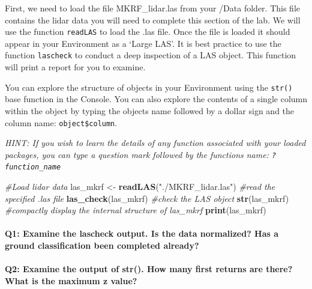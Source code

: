 \documentclass[
]{book}
\newenvironment{Shaded}{\begin{snugshade}}{\end{snugshade}}
\newcommand{\CommentTok}[1]{\textcolor[rgb]{0.56,0.35,0.01}{\textit{#1}}}
\newcommand{\FunctionTok}[1]{\textcolor[rgb]{0.13,0.29,0.53}{\textbf{#1}}}
\newcommand{\NormalTok}[1]{#1}
\newcommand{\OtherTok}[1]{\textcolor[rgb]{0.56,0.35,0.01}{#1}}
\newcommand{\StringTok}[1]{\textcolor[rgb]{0.31,0.60,0.02}{#1}}
\begin{document}
First, we need to load the file MKRF\_lidar.las from your /Data folder. This file contains the lidar data you will need to complete this section of the lab. We will use the function \texttt{readLAS} to load the .las file. Once the file is loaded it should appear in your Environment as a `Large LAS'. It is best practice to use the function \texttt{lascheck} to conduct a deep inspection of a LAS object. This function will print a report for you to examine.

You can explore the structure of objects in your Environment using the \texttt{str()} base function in the Console. You can also explore the contents of a single column within the object by typing the objects name followed by a dollar sign and the column name: \texttt{object\$column}.

\emph{HINT: If you wish to learn the details of any function associated with your loaded packages, you can type a question mark followed by the functions name: \texttt{?function\_name}}

\begin{Shaded}
\begin{Highlighting}[]
\CommentTok{\#Load lidar data}
\NormalTok{las\_mkrf }\OtherTok{\textless{}{-}} \FunctionTok{readLAS}\NormalTok{(}\StringTok{"./MKRF\_lidar.las"}\NormalTok{) }\CommentTok{\#read the specified .las file  }
\FunctionTok{las\_check}\NormalTok{(las\_mkrf) }\CommentTok{\#check the LAS object}
\FunctionTok{str}\NormalTok{(las\_mkrf) }\CommentTok{\#compactly display the internal structure of las\_mkrf}
\FunctionTok{print}\NormalTok{(las\_mkrf)}
\end{Highlighting}
\end{Shaded}

\hypertarget{q1-examine-the-lascheck-output.-is-the-data-normalized-has-a-ground-classification-been-completed-already}{%
\paragraph*{Q1: Examine the lascheck output. Is the data normalized? Has a ground classification been completed already?}\label{q1-examine-the-lascheck-output.-is-the-data-normalized-has-a-ground-classification-been-completed-already}}

\hypertarget{q2-examine-the-output-of-str.-how-many-first-returns-are-there-what-is-the-maximum-z-value}{%
\paragraph*{Q2: Examine the output of str(). How many first returns are there? What is the maximum z value?}\label{q2-examine-the-output-of-str.-how-many-first-returns-are-there-what-is-the-maximum-z-value}}
\end{document}
